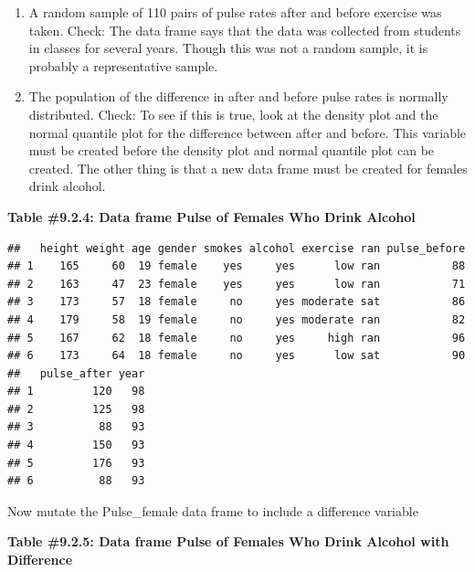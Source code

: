 \documentclass[]{book}
\newenvironment{Shaded}{\begin{snugshade}}{\end{snugshade}}
\newcommand{\KeywordTok}[1]{\textcolor[rgb]{0.13,0.29,0.53}{\textbf{#1}}}
\newcommand{\NormalTok}[1]{#1}
\newcommand{\OperatorTok}[1]{\textcolor[rgb]{0.81,0.36,0.00}{\textbf{#1}}}
\newcommand{\StringTok}[1]{\textcolor[rgb]{0.31,0.60,0.02}{#1}}
\begin{document}
\begin{enumerate}
\def\labelenumi{\alph{enumi}.}
\item
  A random sample of 110 pairs of pulse rates after and before exercise was taken. Check: The data frame says that the data was collected from students in classes for several years. Though this was not a random sample, it is probably a representative sample.
\item
  The population of the difference in after and before pulse rates is normally distributed. Check: To see if this is true, look at the density plot and the normal quantile plot for the difference between after and before. This variable must be created before the density plot and normal quantile plot can be created. The other thing is that a new data frame must be created for females drink alcohol.
\end{enumerate}

\textbf{Table \#9.2.4: Data frame Pulse of Females Who Drink Alcohol}

\begin{Shaded}
\end{Shaded}

\begin{verbatim}
##   height weight age gender smokes alcohol exercise ran pulse_before
## 1    165     60  19 female    yes     yes      low ran           88
## 2    163     47  23 female    yes     yes      low ran           71
## 3    173     57  18 female     no     yes moderate sat           86
## 4    179     58  19 female     no     yes moderate ran           82
## 5    167     62  18 female     no     yes     high ran           96
## 6    173     64  18 female     no     yes      low sat           90
##   pulse_after year
## 1         120   98
## 2         125   98
## 3          88   93
## 4         150   93
## 5         176   93
## 6          88   93
\end{verbatim}

Now mutate the Pulse\_female data frame to include a difference variable

\textbf{Table \#9.2.5: Data frame Pulse of Females Who Drink Alcohol with Difference}
\end{document}
